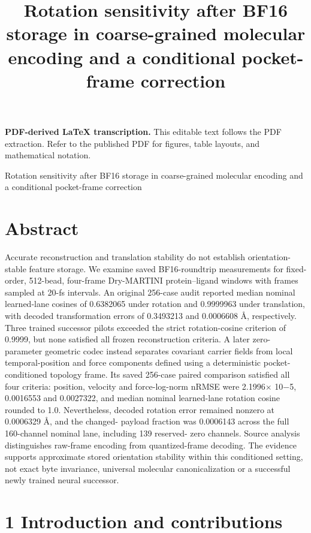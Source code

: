 \documentclass[11pt]{article}
\title{Rotation sensitivity after BF16 storage in coarse-grained molecular encoding and a conditional pocket-frame correction}
\author{}
\date{}
\begin{document}
\maketitle
\noindent\textbf{PDF-derived LaTeX transcription.} This editable text follows the PDF extraction. Refer to the published PDF for figures, table layouts, and mathematical notation.


Rotation sensitivity after BF16 storage in coarse-grained molecular
encoding and a conditional pocket-frame correction

\section*{Abstract}

Accurate reconstruction and translation stability do not establish orientation-stable feature
storage. We examine saved BF16-roundtrip measurements for fixed-order, 512-bead, four-frame
Dry-MARTINI protein–ligand windows with frames sampled at 20-fs intervals. An original
256-case audit reported median nominal learned-lane cosines of 0.6382065 under rotation and
0.9999963 under translation, with decoded transformation errors of 0.3493213 and 0.0006608 Å,
respectively. Three trained successor pilots exceeded the strict rotation-cosine criterion of 0.9999,
but none satisfied all frozen reconstruction criteria. A later zero-parameter geometric codec
instead separates covariant carrier fields from local temporal-position and force components
defined using a deterministic pocket-conditioned topology frame. Its saved 256-case paired
comparison satisfied all four criteria: position, velocity and force-log-norm nRMSE were 2.1996\ensuremath{\times}
10\ensuremath{-}5, 0.0016553 and 0.0027322, and median nominal learned-lane rotation cosine rounded to
1.0. Nevertheless, decoded rotation error remained nonzero at 0.0006329 Å, and the changed-
payload fraction was 0.0006143 across the full 160-channel nominal lane, including 139 reserved-
zero channels. Source analysis distinguishes raw-frame encoding from quantized-frame decoding.
The evidence supports approximate stored orientation stability within this conditioned setting,
not exact byte invariance, universal molecular canonicalization or a successful newly trained
neural successor.

\section*{1 Introduction and contributions}
\end{document}
